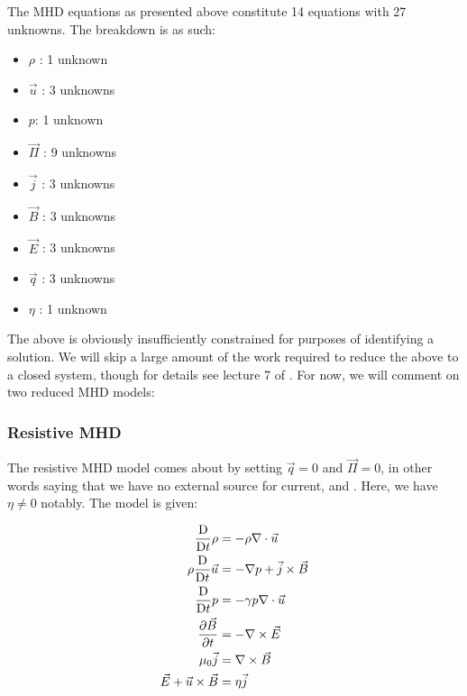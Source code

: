 \begin{remark}
    The MHD equations as presented above constitute 14 equations with 27 unknowns. The breakdown is as such:
    \begin{itemize}
        \item $\rho$ : 1 unknown
        \item $\vec{u}$ : 3 unknowns
        \item $p$: 1 unknown
        \item $\vec{\Pi}$ : 9 unknowns
        \item $\vec{j}$ : 3 unknowns
        \item $\vec{B}$ : 3 unknowns
        \item $\vec{E}$ : 3 unknowns
        \item $\vec{q}$ : 3 unknowns
        \item $\eta$ : 1 unknown
    \end{itemize}
\end{remark}

The above is obviously insufficiently constrained for purposes of identifying a solution. We will skip a large amount 
of the work required to reduce the above to a closed system, though for details see lecture 7 of \cite{mhd-lectures}. 
For now, we will comment on two reduced MHD models:

\subsubsection{Resistive MHD}
The resistive MHD model comes about by setting $\vec{q} = 0$ and $\vec{\Pi} = 0$, in other words saying that we have no 
external source for current, and . Here, we have $\eta \ne 0$ notably. The model 
is given:
\begin{definition}
    \begin{align}
        \frac{\text{D}}{\text{D} t} \rho &= -\rho \nabla \cdot \vec{u} \\
        \rho \frac{\text{D}}{\text{D} t} \vec{u} &= -\nabla p + \vec{j} \times \vec{B}\\
        \frac{\text{D}}{\text{D} t} p  &= -\gamma p \nabla \cdot \vec{u} \\
        \pdv{\vec{B}}{t} &= -\nabla \times \vec{E} \\
        \mu_0 \vec{j} &= \nabla \times \vec{B} \\
        \vec{E} + \vec{u} \times \vec{B} &= \eta \vec{j}
    \end{align}
\end{definition}

